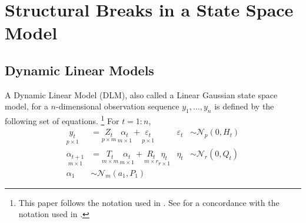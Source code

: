 \documentclass{article}
\newcommand{\dist}[1]{\mathcal{#1}}
\newcommand{\paren}[1]{\ensuremath{\left(#1\right)}}
\newcommand{\dmvnorm}[2]{\ensuremath{\dist{N}_{#2}\paren{#1}}}
\begin{document}
\section{Structural Breaks in a State Space Model}
\label{sec:struct-breaks-state}

\subsection{Dynamic Linear Models}
\label{sec:dynam-line-models}

A Dynamic Linear Model (DLM), also called a Linear Gaussian state space model, for a $n$-dimensional observation sequence $y_{1}, \dots, y_{n}$ is defined by the following set of equations.%
\footnote{This paper follows the notation used in \textcite{DurbinKoopman2001}. See \textcite{PetrisPetroneEtAl2009} for a concordance with the notation used in \textcite{WestHarrison1997}.}
For $t = 1:n$,
\begin{align}
  \label{eq:8}
  \underset{p \times 1}{y_t} &= \underset{p \times m}{Z_{t}} \, \underset{m \times 1}{\alpha_t} + \underset{p \times 1}{\varepsilon_t} & \varepsilon_{t} &\sim \dmvnorm{0, H_{t}}{p} \\
  \label{eq:14}
  \underset{m \times 1}{\alpha_{t+1}} &= \underset{m \times m}{T_{t}} \, \underset{m \times 1}{\alpha_{t}} + \underset{m \times r}{R_{t}}  \underset{r \times 1}{\eta_{t}} & \eta_{t} &\sim \dmvnorm{0, Q_{t}}{r} \\
  \label{eq:2}
  \alpha_{1} & \sim \dmvnorm{a_{1}, P_{1}}{m}
\end{align}
\end{document}
